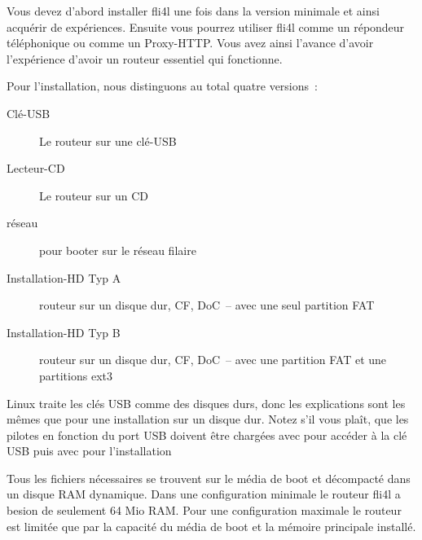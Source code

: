 Vous devez d'abord installer fli4l une fois dans la version minimale et ainsi
acquérir de expériences. Ensuite vous pourrez utiliser fli4l comme un répondeur
téléphonique ou comme un Proxy-HTTP. Vous avez ainsi l'avance d'avoir l'expérience
d'avoir un routeur essentiel qui fonctionne.

Pour l'installation, nous distinguons au total quatre versions~:

\begin{description}
\item[Clé-USB] Le routeur sur une clé-USB
\item[Lecteur-CD] Le routeur sur un CD
\item[réseau] pour booter sur le réseau filaire
\item[Installation-HD Typ A] routeur sur un disque dur, CF, DoC~-- avec une
  seul partition FAT
\item[Installation-HD Typ B] routeur sur un disque dur, CF, DoC~-- avec une
  partition FAT et une partitions ext3
\end{description}



Linux traite les clés USB comme des disques durs, donc les explications sont
les mêmes que pour une installation sur un disque dur. Notez s'il vous plaît,
que les pilotes en fonction du port USB doivent être chargées avec 
pour accéder à la clé USB puis avec  pour l'installation 



Tous les fichiers nécessaires se trouvent sur le média de boot et décompacté
dans un disque RAM dynamique. Dans une configuration minimale le routeur fli4l
a besion de seulement 64 Mio RAM. Pour une configuration maximale le routeur est
limitée que par la capacité du média de boot et la mémoire principale installé.



